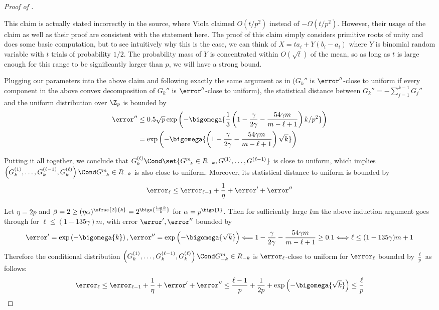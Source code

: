 \begin{proof}[Proof of ]
		{\color{black}\begin{remark}
		\label{remark:uniform}
		This claim is actually stated incorrectly in the source, where Viola claimed $O(t/p^2)$ instead of $-\Omega(t/p^2)$. However, their usage of the claim as well as their proof are consistent with the statement here. The proof of this claim simply considers primitive roots of unity and does some basic computation, but to see intuitively why this is the case, we can think of $X = ta_i + Y(b_i - a_i)$ where $Y$ is binomial random variable with $t$ trials of probability $1/2$. The probability mass of $Y$ is concentrated within $O(\sqrt{t})$ of the mean, so as long as $t$ is large enough for this range to be significantly larger than $p$, we will have a strong bound.
		\end{remark}
		}

		Plugging our parameters into the above claim and following exactly the same argument as in \cite{Viola:2013we} ($G_k''$ is $\error''$-close to uniform if every component in the above convex decomposition of $G_k''$ is $\error''$-close to uniform),
		the statistical distance between $G_k''=-\sum_{j=1}^{k-1} G_j''$ and the uniform distribution over $\Z_p$ is bounded by
		\begin{align*}
			\error'' &\le 0.5\sqrt{p}\exp\left(-\bigomega{\frac{1}{3} \left(1-\frac{\gamma}{2\gamma}- \frac {54\gamma m}{m-\ell+1}\right)k/p^2} \right)\\
			&= \exp\left(-\bigomega{\left(1-\frac{\gamma}{2\gamma}- \frac {54\gamma m}{m-\ell+1}\right)\sqrt{k}} \right)
		\end{align*}


		Putting it all together, we conclude that $G_k^{(\ell)}\Cond\set{G_{-k}^m\in R_{-k}, G^{(1)},\dots,G^{(\ell-1)}}$ is close to uniform,
		which implies 
		$\left(G_k^{(1)},\dots,G_k^{(\ell-1)},G_k^{(\ell)}\right)\Cond G_{-k}^m \in R_{-k}$ is also close to uniform.
		Moreover, its statistical distance to uniform is bounded by 
		\begin{align*}
			\error_{\ell} \le \error_{\ell-1}+ \frac{1}{\eta}+\error'+\error''
		\end{align*}

		Let $\eta=2p$ and $\beta=2\ge (\eta\alpha)^{\sfrac{2}{k}}=2^{\bigo{\frac{\log k}{k}}}$ for $\alpha=p^\bigo{1}$.
		Then for sufficiently large $k$m 
		the above induction argument goes through for $\ell\le (1-135\gamma) m$, with error $\error',\error''$ bounded by
		$$ \error'= \exp\left(-\bigomega{{k}}\right), \error''=\exp\left(-\bigomega{\sqrt{k}}\right) \Longleftarrow 1-\frac{\gamma}{2\gamma}- \frac {54\gamma m}{m-\ell+1}
		\ge 0.1 \Longleftrightarrow \ell \le (1-135\gamma) m +1 $$
		Therefore the conditional distribution $\left(G_k^{(1)},\dots,G_k^{(\ell-1)},G_k^{(\ell)}\right)\Cond G_{-k}^m \in R_{-k}$ is $\error_{\ell}$-close to uniform for $\error_{\ell}$ bounded by $\frac{\ell}{p}$ as follows:
		$$\error_{\ell} \le \error_{\ell-1}+\frac{1}{\eta}+\error'+\error''\le \frac{\ell-1}{p}+\frac{1}{2p}+ \exp\left(-\bigomega{\sqrt{k}}\right)\le \frac{\ell}{p}$$


\end{proof}
